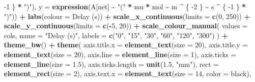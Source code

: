 \documentclass[
]{krantz}
\makeatletter
\newenvironment{Shaded}{\begin{snugshade}}{\end{snugshade}}
\newcommand{\DataTypeTok}[1]{\textcolor[rgb]{0.13,0.29,0.53}{#1}}
\newcommand{\DecValTok}[1]{\textcolor[rgb]{0.00,0.00,0.81}{#1}}
\newcommand{\FloatTok}[1]{\textcolor[rgb]{0.00,0.00,0.81}{#1}}
\newcommand{\KeywordTok}[1]{\textcolor[rgb]{0.13,0.29,0.53}{\textbf{#1}}}
\newcommand{\NormalTok}[1]{#1}
\newcommand{\OperatorTok}[1]{\textcolor[rgb]{0.81,0.36,0.00}{\textbf{#1}}}
\newcommand{\StringTok}[1]{\textcolor[rgb]{0.31,0.60,0.02}{#1}}
\newenvironment{kframe}{%
\medskip{}
\setlength{\fboxsep}{.8em}
 \def\at@end@of@kframe{}%
 \ifinner\ifhmode%
  \def\at@end@of@kframe{\end{minipage}}%
  \begin{minipage}{\columnwidth}%
 \fi\fi%
 \def\FrameCommand##1{\hskip\@totalleftmargin \hskip-\fboxsep
 \colorbox{shadecolor}{##1}\hskip-\fboxsep
     \hskip-\linewidth \hskip-\@totalleftmargin \hskip\columnwidth}%
 \MakeFramed {\advance\hsize-\width
   \@totalleftmargin\z@ \linewidth\hsize
   \@setminipage}}%
 {\par\unskip\endMakeFramed%
 \at@end@of@kframe}
\renewenvironment{Shaded}{\begin{kframe}}{\end{kframe}}
\makeatother
\begin{document}
\begin{Shaded}
\begin{Highlighting}[]
    \DecValTok{{-}1}
\NormalTok{  \} }\OperatorTok{*}\StringTok{ ")"}\NormalTok{),}
  \DataTypeTok{y =} \KeywordTok{expression}\NormalTok{(A[net] }\OperatorTok{\textasciitilde{}}\StringTok{ "("} \OperatorTok{*}\StringTok{ }\NormalTok{mu }\OperatorTok{*}\StringTok{ }\NormalTok{mol }\OperatorTok{\textasciitilde{}}\StringTok{ }\NormalTok{m }\OperatorTok{\^{}}\StringTok{ }\NormalTok{\{}
    \DecValTok{{-}2}
\NormalTok{  \} }\OperatorTok{\textasciitilde{}}\StringTok{ }\NormalTok{s }\OperatorTok{\^{}}\StringTok{ }\NormalTok{\{}
    \DecValTok{{-}1}
\NormalTok{  \} }\OperatorTok{*}\StringTok{ ")"}\NormalTok{)) }\OperatorTok{+}
\StringTok{  }\KeywordTok{labs}\NormalTok{(}\DataTypeTok{colour =} \StringTok{\textquotesingle{}Delay (s)\textquotesingle{}}\NormalTok{) }\OperatorTok{+}
\StringTok{  }\KeywordTok{scale\_x\_continuous}\NormalTok{(}\DataTypeTok{limits =} \KeywordTok{c}\NormalTok{(}\DecValTok{0}\NormalTok{, }\DecValTok{250}\NormalTok{)) }\OperatorTok{+}
\StringTok{  }\KeywordTok{scale\_y\_continuous}\NormalTok{(}\DataTypeTok{limits =} \KeywordTok{c}\NormalTok{(}\OperatorTok{{-}}\DecValTok{5}\NormalTok{, }\DecValTok{20}\NormalTok{)) }\OperatorTok{+}
\StringTok{  }\KeywordTok{scale\_colour\_manual}\NormalTok{(}
    \DataTypeTok{values =}\NormalTok{ cols,}
    \DataTypeTok{name =} \StringTok{"Delay (s)"}\NormalTok{,}
    \DataTypeTok{labels =} \KeywordTok{c}\NormalTok{(}\StringTok{"0"}\NormalTok{, }\StringTok{"15"}\NormalTok{, }\StringTok{"30"}\NormalTok{, }\StringTok{"60"}\NormalTok{, }\StringTok{"120"}\NormalTok{, }\StringTok{"300"}\NormalTok{)}
\NormalTok{  ) }\OperatorTok{+}
\StringTok{  }\KeywordTok{theme\_bw}\NormalTok{() }\OperatorTok{+}
\StringTok{  }\KeywordTok{theme}\NormalTok{(}
    \DataTypeTok{axis.title.x =} \KeywordTok{element\_text}\NormalTok{(}\DataTypeTok{size =} \DecValTok{20}\NormalTok{),}
    \DataTypeTok{axis.title.y =} \KeywordTok{element\_text}\NormalTok{(}\DataTypeTok{size =} \DecValTok{20}\NormalTok{),}
    \DataTypeTok{axis.line =} \KeywordTok{element\_line}\NormalTok{(}\DataTypeTok{size =} \DecValTok{1}\NormalTok{),}
    \DataTypeTok{axis.ticks =} \KeywordTok{element\_line}\NormalTok{(}\DataTypeTok{size =} \FloatTok{1.5}\NormalTok{),}
    \DataTypeTok{axis.ticks.length =} \KeywordTok{unit}\NormalTok{(}\FloatTok{1.5}\NormalTok{, }\StringTok{"mm"}\NormalTok{),}
    \DataTypeTok{rect =} \KeywordTok{element\_rect}\NormalTok{(}\DataTypeTok{size =} \DecValTok{2}\NormalTok{),}
    \DataTypeTok{axis.text.x =} \KeywordTok{element\_text}\NormalTok{(}\DataTypeTok{size =} \DecValTok{14}\NormalTok{, }\DataTypeTok{color =} \StringTok{\textquotesingle{}black\textquotesingle{}}\NormalTok{),}

\end{Highlighting}
\end{Shaded}
\end{document}
